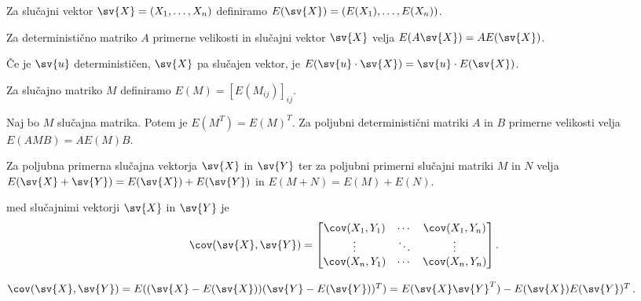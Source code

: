 
\begin{definicija}
  Za slučajni vektor $\sv{X} = (X_1, \ldots, X_n)$ definiramo $E(\sv{X}) =
  (E(X_1), \ldots, E(X_n))$.
\end{definicija}

\begin{trditev}
  Za deterministično matriko $A$ primerne velikosti in slučajni vektor $\sv{X}$
  velja $E(A \sv{X}) = A E(\sv{X})$.
\end{trditev}

\begin{posledica}
  Če je $\sv{u}$ determinističen, $\sv{X}$ pa slučajen vektor, je $E(\sv{u}
  \cdot \sv{X}) = \sv{u} \cdot E(\sv{X})$.
\end{posledica}

\begin{definicija}
  Za slučajno matriko $M$ definiramo $E(M) = [E(M_{ij})]_{ij}$.
\end{definicija}

\begin{trditev}
  Naj bo $M$ slučajna matrika.
  Potem je $E(M^T) = E(M)^T$.
  Za poljubni deterministični matriki $A$ in $B$ primerne velikosti velja $E(A M
  B) = A E(M) B$.
\end{trditev}

\begin{trditev}
  Za poljubna primerna slučajna vektorja $\sv{X}$ in $\sv{Y}$ ter za poljubni
  primerni slučajni matriki $M$ in $N$ velja $E(\sv{X} + \sv{Y}) = E(\sv{X}) +
  E(\sv{Y})$ in $E(M + N) = E(M) + E(N)$.
\end{trditev}

\begin{definicija}
   med slučajnimi vektorji $\sv{X}$ in $\sv{Y}$ je
  \[
	\cov(\sv{X}, \sv{Y}) =
	\begin{bmatrix}
	  \cov(X_1, Y_1) & \cdots & \cov(X_1, Y_n) \\
	  \vdots & \ddots & \vdots \\
	  \cov(X_n, Y_1) & \cdots & \cov(X_n, Y_n)
	\end{bmatrix}.
  \]
\end{definicija}

\begin{trditev}
  $\cov(\sv{X}, \sv{Y}) = E((\sv{X} - E(\sv{X}))(\sv{Y} - E(\sv{Y}))^T) =
  E(\sv{X} \sv{Y}^T) - E(\sv{X}) E(\sv{Y})^T$.
\end{trditev}

